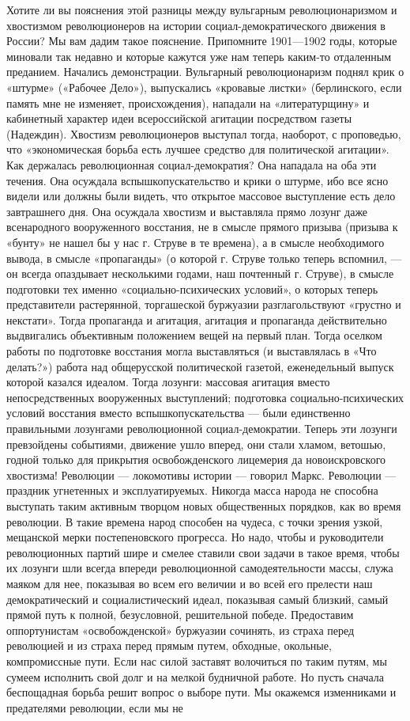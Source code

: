 \documentclass[12pt]{article}
\newcommand{\parnum}{(\arabic{parcount})}
\newcounter{parcount}
\newenvironment{parnumbers}{%
  \par%
  \everypar{\noindent \stepcounter{parcount}\marginpar[]{\parnum}}%
}{}
\begin{document}
\begin{parnumbers}
Хотите ли вы пояснения этой разницы между вульгарным революционаризмом и хвостизмом революционеров на истории социал-демократического движения в России? Мы вам дадим такое пояснение. Припомните 1901—1902 годы, которые миновали так недавно и которые кажутся уже нам теперь каким-то отдаленным преданием. Начались демонстрации. Вульгарный революционаризм поднял крик о «штурме» («Рабочее Дело»), выпускались «кровавые листки» (берлинского, если память мне не изменяет, происхождения), нападали на «литературщину» и кабинетный характер идеи всероссийской агитации посредством газеты (Надеждин). Хвостизм революционеров выступал тогда, наоборот, с проповедью, что «экономическая борьба есть лучшее средство для политической агитации». Как держалась революционная социал-демократия? Она нападала на оба эти течения. Она осуждала вспышкопускательство и крики о штурме, ибо все ясно видели или должны были видеть, что открытое массовое выступление есть дело завтрашнего дня. Она осуждала хвостизм и выставляла прямо лозунг даже всенародного вооруженного восстания, не в смысле прямого призыва (призыва к «бунту» не нашел бы у нас г. Струве в те времена), а в смысле необходимого вывода, в смысле «пропаганды» (о которой г. Струве только теперь вспомнил, — он всегда опаздывает несколькими годами, наш почтенный г. Струве), в смысле подготовки тех именно «социально-психических условий», о которых теперь представители растерянной, торгашеской буржуазии разглагольствуют «грустно и некстати». Тогда пропаганда и агитация, агитация и пропаганда действительно выдвигались объективным положением вещей на первый план. Тогда оселком работы по подготовке восстания могла выставляться (и выставлялась в «Что делать?») работа над общерусской политической газетой, еженедельный выпуск которой казался идеалом. Тогда лозунги: массовая агитация вместо непосредственных вооруженных выступлений; подготовка социально-психических условий восстания вместо вспышкопускательства — были единственно правильными лозунгами революционной социал-демократии. Теперь эти лозунги превзойдены событиями, движение ушло вперед, они стали хламом, ветошью, годной только для прикрытия освобожденского лицемерия да новоискровского хвостизма! Революции — локомотивы истории — говорил Маркс. Революции — праздник угнетенных и эксплуатируемых. Никогда масса народа не способна выступать таким активным творцом новых общественных порядков, как во время революции. В такие времена народ способен на чудеса, с точки зрения узкой, мещанской мерки постепеновского прогресса. Но надо, чтобы и руководители революционных партий шире и смелее ставили свои задачи в такое время, чтобы их лозунги шли всегда впереди революционной самодеятельности массы, служа маяком для нее, показывая во всем его величии и во всей его прелести наш демократический и социалистический идеал, показывая самый близкий, самый прямой путь к полной, безусловной, решительной победе. Предоставим оппортунистам «освобожденской» буржуазии сочинять, из страха перед революцией и из страха перед прямым путем, обходные, окольные, компромиссные пути. Если нас силой заставят волочиться по таким путям, мы сумеем исполнить свой долг и на мелкой будничной работе. Но пусть сначала беспощадная борьба решит вопрос о выборе пути. Мы окажемся изменниками и предателями революции, если мы не 
\end{parnumbers}
\end{document}
